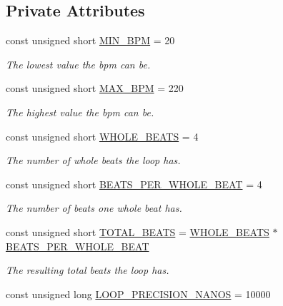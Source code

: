 \subsection*{Private Attributes}
\begin{DoxyCompactItemize}
\item 
const unsigned short \hyperlink{class_drum_machine_a221c0cd8b5cf3f2342f57ad539d3628a}{M\+I\+N\+\_\+\+B\+PM} = 20
\begin{DoxyCompactList}\small\item\em The lowest value the bpm can be. \end{DoxyCompactList}\item 
const unsigned short \hyperlink{class_drum_machine_a0b64f2e265bb9fc06729090b7e05c005}{M\+A\+X\+\_\+\+B\+PM} = 220
\begin{DoxyCompactList}\small\item\em The highest value the bpm can be. \end{DoxyCompactList}\item 
const unsigned short \hyperlink{class_drum_machine_a54e06658e13970dc7679051e8194f546}{W\+H\+O\+L\+E\+\_\+\+B\+E\+A\+TS} = 4
\begin{DoxyCompactList}\small\item\em The number of whole beats the loop has. \end{DoxyCompactList}\item 
const unsigned short \hyperlink{class_drum_machine_ab4d2056f29b6eb959aa379afcc6b70f0}{B\+E\+A\+T\+S\+\_\+\+P\+E\+R\+\_\+\+W\+H\+O\+L\+E\+\_\+\+B\+E\+AT} = 4
\begin{DoxyCompactList}\small\item\em The number of beats one whole beat has. \end{DoxyCompactList}\item 
const unsigned short \hyperlink{class_drum_machine_a25ff7c6556614ab787a626a5c6ec1683}{T\+O\+T\+A\+L\+\_\+\+B\+E\+A\+TS} = \hyperlink{class_drum_machine_a54e06658e13970dc7679051e8194f546}{W\+H\+O\+L\+E\+\_\+\+B\+E\+A\+TS} $\ast$ \hyperlink{class_drum_machine_ab4d2056f29b6eb959aa379afcc6b70f0}{B\+E\+A\+T\+S\+\_\+\+P\+E\+R\+\_\+\+W\+H\+O\+L\+E\+\_\+\+B\+E\+AT}
\begin{DoxyCompactList}\small\item\em The resulting total beats the loop has. \end{DoxyCompactList}\item 
const unsigned long \hyperlink{class_drum_machine_a847e09081c90dbb33c602506d5adb743}{L\+O\+O\+P\+\_\+\+P\+R\+E\+C\+I\+S\+I\+O\+N\+\_\+\+N\+A\+N\+OS} = 10000

\end{DoxyCompactItemize}
